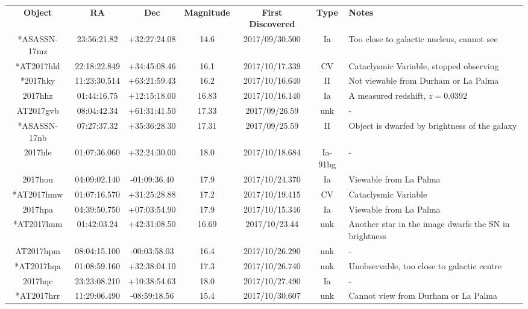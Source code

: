 \documentclass[twocolumn]{revtex4}
\begin{document}
{\renewcommand{\arraystretch}{1.2}%
\begin{table}[h!]
\centering    
\begin{tabularx}{\textwidth}{c c c c @{\hskip 5pt} c c X}
    \hline
    \textbf{Object} & \textbf{RA} & \textbf{Dec} & \textbf{Magnitude} &\textbf{First Discovered} &\textbf{Type} & \textbf{Notes} \\ 
    *ASASSN-17mz & 23:56:21.82 & +32:27:24.08 & 14.6 & 2017/09/30.500 & Ia & {Too close to galactic nucleus, cannot see}  \\
    *AT2017hld & 22:18:22.849 & +34:45:08.46 & 16.1 & 2017/10/17.339 & CV & {Cataclysmic Variable, stopped observing}  \\
    *2017hky & 11:23:30.514 & +63:21:59.43 & 16.2 & 2017/10/16.640 & II & {Not viewable from Durham or La Palma}  \\
    2017hhz & 01:44:16.75 & +12:15:18.00 & 16.83 & 2017/10/16.140 & Ia & {A measured redshift, $z=0.0392$}  \\
    AT2017gvb & 08:04:42.34 & +61:31:41.50 & 17.33 & 2017/09/26.59 & unk & {-}  \\
    *ASASSN-17nb & 07:27:37.32 & +35:36:28.30 & 17.31 & 2017/09/25.59 & II & {Object is dwarfed by brightness of the galaxy}  \\
    2017hle & 01:07:36.060 & +32:24:30.00 & 18.0 & 2017/10/18.684 & Ia-91bg & {-}  \\
    2017hou & 04:09:02.140 & -01:09:36.40 & 17.9 & 2017/10/24.370 &Ia & {Viewable from La Palma}  \\
    *AT2017hmw & 01:07:16.570 & +31:25:28.88 & 17.2 & 2017/10/19.415 & CV & {Cataclysmic Variable}  \\
    2017hpa & 04:39:50.750 & +07:03:54.90 & 17.9 & 2017/10/15.346 & Ia & {Viewable from La Palma}  \\
    *AT2017hnm & 01:42:03.24 & +42:31:08.50 & 16.69 & 2017/10/23.44 & unk & {Another star in the image dwarfs the SN in brightness}  \\
    AT2017hpm & 08:04:15.100 & -00:03:58.03 & 16.4 & 2017/10/26.290 & unk & {-}  \\
    *AT2017hqa & 01:08:59.160 & +32:38:04.10 & 17.3 & 2017/10/26.740 & unk & {Unobservable, too close to galactic centre}  \\
    2017hqc & 23:23:08.210 & +10:38:54.63 & 18.0 & 2017/10/27.490 & Ia & {-}  \\
    *AT2017hrr & 11:29:06.490 & -08:59:18.56 & 15.4 & 2017/10/30.607 & unk & {Cannot view from Durham or La Palma}  \\

\end{tabularx}
\end{table}}
\end{document}
